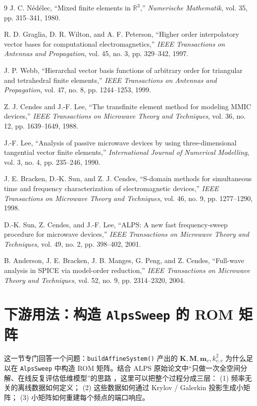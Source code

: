 \documentclass[UTF8,a4paper,11pt]{ctexart}
\newcommand{\code}[1]{\texttt{\small #1}}
\begin{document}
\begin{thebibliography}{9}
J. C. Nédélec,
``Mixed finite elements in $\mathbb{R}^3$,''
\emph{Numerische Mathematik}, vol. 35, pp. 315--341, 1980.

R. D. Graglia, D. R. Wilton, and A. F. Peterson,
``Higher order interpolatory vector bases for computational electromagnetics,''
\emph{IEEE Transactions on Antennas and Propagation}, vol. 45, no. 3, pp. 329--342, 1997.

J. P. Webb,
``Hierarchal vector basis functions of arbitrary order for triangular and tetrahedral finite elements,''
\emph{IEEE Transactions on Antennas and Propagation}, vol. 47, no. 8, pp. 1244--1253, 1999.

Z. J. Cendes and J.-F. Lee,
``The transfinite element method for modeling MMIC devices,''
\emph{IEEE Transactions on Microwave Theory and Techniques}, vol. 36, no. 12, pp. 1639--1649, 1988.

J.-F. Lee,
``Analysis of passive microwave devices by using three-dimensional tangential vector finite elements,''
\emph{International Journal of Numerical Modelling}, vol. 3, no. 4, pp. 235--246, 1990.

J. E. Bracken, D.-K. Sun, and Z. J. Cendes,
``S-domain methods for simultaneous time and frequency characterization of electromagnetic devices,''
\emph{IEEE Transactions on Microwave Theory and Techniques}, vol. 46, no. 9, pp. 1277--1290, 1998.

D.-K. Sun, Z. Cendes, and J.-F. Lee,
``ALPS: A new fast frequency-sweep procedure for microwave devices,''
\emph{IEEE Transactions on Microwave Theory and Techniques}, vol. 49, no. 2, pp. 398--402, 2001.

B. Anderson, J. E. Bracken, J. B. Manges, G. Peng, and Z. Cendes,
``Full-wave analysis in SPICE via model-order reduction,''
\emph{IEEE Transactions on Microwave Theory and Techniques}, vol. 52, no. 9, pp. 2314--2320, 2004.
\end{thebibliography}

\section{\texorpdfstring{下游用法：构造 \code{AlpsSweep} 的 ROM 矩阵}{下游用法：构造 AlpsSweep 的 ROM 矩阵}}
\label{sec:downstream-rom}

这一节专门回答一个问题：\code{buildAffineSystem()} 产出的 $\bm K,\bm M,\bm m_v,k_{c,v}^2$
为什么足以在 \code{AlpsSweep} 中构造 ROM 矩阵。结合 ALPS 原始论文中“只做一次全空间分解、在线反复评估低维模型”的思路
\cite{Sun2001,Bracken1998,Anderson2004}，这里可以把整个过程分成三层：
(1) 频率无关的离线数据如何定义；
(2) 这些数据如何通过 Krylov / Galerkin 投影生成小矩阵；
(3) 小矩阵如何重建每个频点的端口响应。
\end{document}
